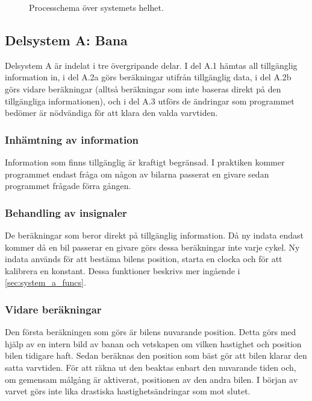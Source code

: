 \begin{figure}
  \caption{Processchema över systemets helhet.}%
  \label{fig:system_diagram}
\end{figure}

  \subsection{Delsystem A: Bana}
  
  Delsystem A är indelat i tre övergripande delar. I del A.1 hämtas all
  tillgänglig information in, i del A.2a görs beräkningar utifrån tillgänglig
  data, i del A.2b görs vidare beräkningar (alltså beräkningar som inte baseras
  direkt på den tillgängliga informationen), och i del A.3 utförs de ändringar
  som programmet bedömer är nödvändiga för att klara den valda varvtiden. 

    \subsubsection{Inhämtning av information}

    Information som finns tillgänglig är kraftigt begränsad. I praktiken kommer
    programmet endast fråga om någon av bilarna passerat en givare sedan
    programmet frågade förra gången.

    \subsubsection{Behandling av insignaler}

    De beräkningar som beror direkt på tillgänglig
    information. Då ny indata endast kommer då en bil passerar en givare görs dessa beräkningar inte varje cykel. 
 Ny indata används för att bestäma bilens position, starta en clocka och för att kalibrera en konstant. Dessa funktioner beskrivs 
mer ingående i \ref{sec:system_a_funcs}.

    \subsubsection{Vidare beräkningar}
    
    Den första beräkningen som görs är bilens nuvarande position. Detta görs med
    hjälp av en intern bild av banan och vetskapen om vilken hastighet och position bilen
    tidigare haft. Sedan beräknas den position som bäst gör att bilen klarar den satta
    varvtiden. För att räkna ut den beaktas enbart den nuvarande tiden och, om gemensam målgång är aktiverat, positionen av den andra bilen.  
I början av varvet görs  inte lika drastiska hastighetsändringar som mot slutet.

